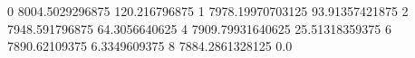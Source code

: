 0 8004.5029296875 120.216796875
1 7978.19970703125 93.91357421875
2 7948.591796875 64.3056640625
4 7909.79931640625 25.51318359375
6 7890.62109375 6.3349609375
8 7884.2861328125 0.0
